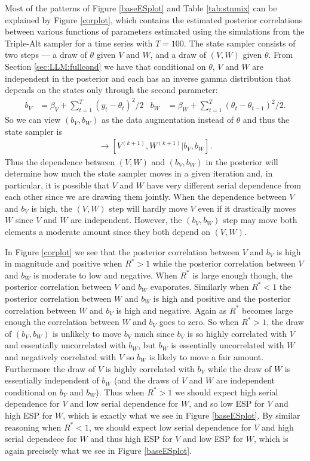 \documentclass{article}
\begin{document}
Most of the patterns of Figure \ref{baseESplot} and Table \ref{tab:stnmix} can be explained by Figure \ref{corplot}, which contains the estimated posterior correlations between various functions of parameters estimated using the simulations from the Triple-Alt sampler for a time series with $T=100$. The state sampler consists of two steps --- a draw of $\theta$ given $V$ and $W$, and a draw of $(V,W)$ given $\theta$. From Section \ref{sec:LLM:fullcond} we have that conditional on $\theta$, $V$ and $W$ are independent in the posterior and each has an inverse gamma distribution that depends on the states only through the second parameter:
\begin{align*}
  b_V &= \beta_V + \sum_{t=1}^T(y_t - \theta_t)^2/2 &
  b_W &= \beta_W + \sum_{t=1}^T(\theta_t - \theta_{t-1})^2/2.
\end{align*}
So we can view $(b_V,b_W)$ as the data augmentation instead of $\theta$ and thus the state sampler is
\begin{align*}
  [b_V, b_W|V^{(k)},W^{(k)}] \to [V^{(k+1)},W^{(k+1)}|b_V,b_W].
\end{align*}
Thus the dependence between $(V,W)$ and $(b_V,b_W)$ in the posterior will determine how much the state sampler moves in a given iteration and, in particular, it is possible that $V$ and $W$ have very different serial dependence from each other since we are drawing them jointly. When the dependence between $V$ and $b_V$ is high, the $(V,W)$ step will hardly move $V$ even if it drastically moves $W$ since $V$ and $W$ are independent. However, the $(b_V,b_W)$ step may move both elements a moderate amount since they both depend on $(V,W)$.

In Figure \ref{corplot} we see that the posterior correlation between $V$ and $b_V$ is high in magnitude and positive when $R^*>1$ while the posterior correlation between $V$ and $b_W$ is moderate to low and negative. When $R^*$ is large enough though, the posterior correlation between $V$ and $b_W$ evaporates. Similarly when $R^*<1$ the posterior correlation between $W$ and $b_W$ is high and positive and the posterior correlation between $W$ and $b_V$ is high and negative. Again as $R^*$ becomes large enough the correlation between $W$ and $b_V$ goes to zero. So when $R^*>1$, the draw of $(b_V, b_W)$ is unlikely to move $b_V$ much since $b_V$ is so highly correlated with $V$ and essentially uncorrelated with $b_W$, but $b_W$ is essentially uncorrelated with $W$ and negatively correlated with $V$ so $b_W$ is likely to move a fair amount. Furthermore the draw of $V$ is highly correlated with $b_V$ while the draw of $W$ is essentially independent of $b_W$ (and the draws of $V$ and $W$ are independent conditional on $b_V$ and $b_W$). Thus when $R^*>1$ we should expect high serial dependence for $V$ and low serial dependence for $W$, and so low ESP for $V$ and high ESP for $W$, which is exactly what we see in Figure \ref{baseESplot}. By similar reasoning when $R^*<1$, we should expect low serial dependence for $V$ and high serial dependece for $W$ and thus high ESP for $V$ and low ESP for $W$, which is again precisely what we see in Figure \ref{baseESplot}.
\end{document}
